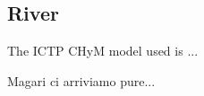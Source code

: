 \documentclass[journal abbreviation, manuscript]{copernicus}
\begin{document}
\subsection{River}

The ICTP CHyM model used is ...

\conclusions  %

Magari ci arriviamo pure...




\end{document}

